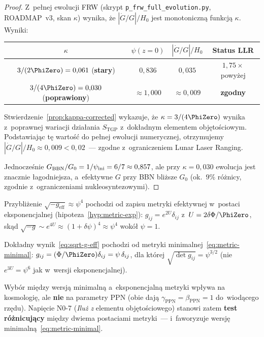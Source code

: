 \begin{proof}
Z~pe\l{}nej ewolucji FRW (skrypt \texttt{p\_frw\_full\_evolution.py},
ROADMAP~v3, skan $\kappa$) wynika, \.ze $|\dot{G}/G|/H_0$ jest
monotonicz\-n\k{a} funkcj\k{a} $\kappa$. Wyniki:
\begin{center}\small
\begin{tabular}{@{}cccc@{}}
\toprule
$\kappa$ & $\psi(z=0)$ & $|\dot{G}/G|/H_0$ & Status LLR \\
\midrule
$3/(2\PhiZero) = 0{,}061$ (\textbf{stary}) & $0{,}836$ & $0{,}035$ &
  $1{,}75\times$ powy\.zej \\
$3/(4\PhiZero) = 0{,}030$ (\textbf{poprawiony}) & $\approx 1{,}000$ &
  $\approx 0{,}009$ & \textbf{zgodny} \\
\bottomrule
\end{tabular}
\end{center}

Stwierdzenie~\ref{prop:kappa-corrected} wykazuje, \.ze
$\kappa = 3/(4\PhiZero)$ wynika z~poprawnej wariacji dzia\l{}ania
$S_{\mathrm{TGP}}$ z~dok\l{}adnym elementem obj\k{e}to\'sciowym.
Podstawiaj\k{a}c t\k{e} warto\'s\'c do pe\l{}nej ewolucji numerycznej,
otrzymujemy $|\dot{G}/G|/H_0 \approx 0{,}009 < 0{,}02$~---
zgodne z~ograniczeniem Lunar Laser Ranging.

\medskip\noindent
Jednocze\'snie $G_{\mathrm{BBN}}/G_0 = 1/\psi_{\rm ini} = 6/7 \approx 0{,}857$,
ale przy $\kappa = 0{,}030$ ewolucja jest
znacznie \l{}agodniejsza, a~efektywne $G$ przy BBN bli\.zsze
$G_0$ (ok.\ $9\%$ r\'o\.znicy, zgodnie z~ograniczeniami
nukleosyntezowymi).
\end{proof}

\begin{remark}%
\label{rem:psi4-vs-psi}
Przybli\.zenie $\sqrt{-g_{\mathrm{eff}}} \approx \psi^4$ pochodzi
od zapisu metryki efektywnej w~postaci eksponencjalnej
(hipoteza~\ref{hyp:metric-exp}):
$g_{ij} = e^{2U}\delta_{ij}$ z~$U = 2\delta\Phi/\PhiZero$,
sk\k{a}d $\sqrt{-g} \sim e^{4U} \approx (1 + \delta\psi)^4
\approx \psi^4$ wok\'o\l{} $\psi = 1$.

Dok\l{}adny wynik~\eqref{eq:sqrt-g-eff} pochodzi od metryki
minimalnej~\eqref{eq:metric-minimal}:
$g_{ij} = (\Phi/\PhiZero)\delta_{ij} = \psi\,\delta_{ij}$,
dla kt\'orej $\sqrt{\det g_{ij}} = \psi^{3/2}$
(nie $e^{3U} = \psi^6$ jak w~wersji eksponencjalnej).

Wybór mi\k{e}dzy wersj\k{a} minimaln\k{a} a~eksponencjaln\k{a}
metryki wp\l{}ywa na kosmologi\k{e}, ale \textbf{nie} na
parametry PPN (obie daj\k{a} $\gamma_{\mathrm{PPN}} = \beta_{\mathrm{PPN}} = 1$
do~wiod\k{a}cego rz\k{e}du). Napi\k{e}cie N0-7 (\emph{Ilu\.z z}
elementu obj\k{e}to\'sciowego) stanowi zatem \textbf{test r\'o\.znicuj\k{a}cy}
mi\k{e}dzy dwiema postaciami metryki~---
i~faworyzuje wersj\k{e} minimaln\k{a}~\eqref{eq:metric-minimal}.
\end{remark}

